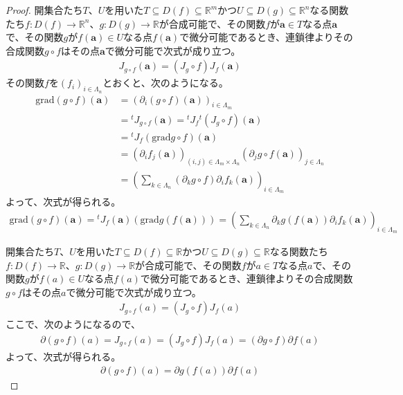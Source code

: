 \documentclass[dvipdfmx]{jsarticle}
\begin{document}
\begin{proof}
開集合たち$T$、$U$を用いた$T \subseteq D(f) \subseteq \mathbb{R}^{m}$かつ$U \subseteq D(g) \subseteq \mathbb{R}^{n}$なる関数たち$f:D(f) \rightarrow \mathbb{R}^{n}$、$g:D(g) \rightarrow \mathbb{R}$が合成可能で、その関数$f$が$\mathbf{a} \in T$なる点$\mathbf{a}$で、その関数$g$が$f\left( \mathbf{a} \right) \in U$なる点$f\left( \mathbf{a} \right)で$微分可能であるとき、連鎖律よりその合成関数$g \circ f$はその点$\mathbf{a}$で微分可能で次式が成り立つ。
\begin{align*}
J_{g \circ f}\left( \mathbf{a} \right) = \left( J_{g} \circ f \right)J_{f}\left( \mathbf{a} \right)
\end{align*}
その関数$f$を$\left( f_{i} \right)_{i \in \varLambda_{n}}$とおくと、次のようになる。
\begin{align*}
\mathrm{grad}(g \circ f)\left( \mathbf{a} \right) &= \left( \partial_{i}(g \circ f)\left( \mathbf{a} \right) \right)_{i \in \varLambda_{m}}\\
&={}^{t}J_{g \circ f}\left( \mathbf{a} \right) ={}^{t}J_{f}{}^{t}\left( J_{g} \circ f \right)\left( \mathbf{a} \right)\\
&={}^{t}J_{f}\left( \mathrm{grad}g \circ f \right)\left( \mathbf{a} \right)\\
&= \left( \partial_{i}f_{j}\left( \mathbf{a} \right) \right)_{(i,j) \in \varLambda_{m} \times \varLambda_{n}}\left( \partial_{j}g \circ f\left( \mathbf{a} \right) \right)_{j \in \varLambda_{n}}\\
&= \left( \sum_{k \in \varLambda_{n}} {\left( \partial_{k}g \circ f \right)\partial_{i}f_{k}\left( \mathbf{a} \right)} \right)_{i \in \varLambda_{m}}
\end{align*}
よって、次式が得られる。
\begin{align*}
\mathrm{grad}(g \circ f)\left( \mathbf{a} \right) ={}^{t}J_{f}\left( \mathbf{a} \right)\left( \mathrm{grad}g\left( f\left( \mathbf{a} \right) \right) \right) = \left( \sum_{k \in \varLambda_{n}} {\partial_{k}g\left( f\left( \mathbf{a} \right) \right)\partial_{i}f_{k}}\left( \mathbf{a} \right) \right)_{i \in \varLambda_{m}}
\end{align*}\par
開集合たち$T$、$U$を用いた$T \subseteq D(f) \subseteq \mathbb{R}$かつ$U \subseteq D(g) \subseteq \mathbb{R}$なる関数たち$f:D(f) \rightarrow \mathbb{R}$、$g:D(g) \rightarrow \mathbb{R}$が合成可能で、その関数$f$が$a \in T$なる点$a$で、その関数$g$が$f(a) \in U$なる点$f(a)$で微分可能であるとき、連鎖律よりその合成関数$g \circ f$はその点$a$で微分可能で次式が成り立つ。
\begin{align*}
J_{g \circ f}(a) = \left( J_{g} \circ f \right)J_{f}(a)
\end{align*}
ここで、次のようになるので、
\begin{align*}
\partial(g \circ f)(a) = J_{g \circ f}(a) = \left( J_{g} \circ f \right)J_{f}(a) = (\partial g \circ f)\partial f(a)
\end{align*}
よって、次式が得られる。
\begin{align*}
\partial(g \circ f)(a) = \partial g\left( f(a) \right)\partial f(a)
\end{align*}
\end{proof}
\end{document}
